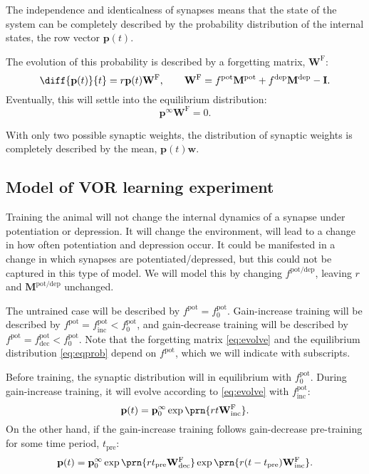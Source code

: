 \documentclass[12pt]{article}
\newcommand{\I}{\mathbf{I}}
\newcommand{\pr}{\mathbf{p}}
\newcommand{\eq}{\pr^\infty}
\newcommand{\w}{\mathbf{w}}
\newcommand{\W}{\mathbf{W}}
\newcommand{\frg}{\W^\mathrm{F}}
\newcommand{\M}{\mathbf{M}}
\newcommand{\pot}{^{\text{pot}}}
\newcommand{\dep}{^{\text{dep}}}
\newcommand{\potdep}{^{\text{pot/dep}}}
\newcommand{\norm}{_0}
\newcommand{\inc}{_{\text{inc}}}
\newcommand{\dec}{_{\text{dec}}}
\newcommand{\tpre}{t_{\text{pre}}}
\begin{document}
The independence and identicalness of synapses means that the state of the system can be completely described by the probability distribution of the internal states, the row vector $\pr(t)$.

The evolution of this probability is described by a forgetting matrix, $\frg$:
%
\begin{equation}\label{eq:evolve}
  \diff{\pr(t)}{t} = r\pr(t)\frg,
  \qquad
  \frg = f\pot\M\pot+f\dep\M\dep-\I.
\end{equation}
%
Eventually, this will settle into the equilibrium distribution:
%
\begin{equation}\label{eq:eqprob}
  \eq\frg=0.
\end{equation}
%



With only two possible synaptic weights, the distribution of synaptic weights is completely described by the mean, $\pr(t)\w$.


\subsection{Model of VOR learning experiment}\label{sec:learning}

Training the animal will not change the internal dynamics of a synapse under potentiation or depression.
It will change the environment, will lead to a change in how often potentiation and depression occur.
It could be manifested in a change in which synapses are potentiated/depressed, but this could not be captured in this type of model.
We will model this by changing $f\potdep$, leaving $r$ and $\M\potdep$ unchanged.

The untrained case will be described by $f\pot=f\pot\norm$.
Gain-increase training  will be described by $f\pot=f\pot\inc<f\pot\norm$, and
gain-decrease training  will be described by $f\pot=f\pot\dec<f\pot\norm$. Note that the forgetting matrix \eqref{eq:evolve} and the equilibrium distribution \eqref{eq:eqprob} depend on $f\pot$, which we will indicate with subscripts.

Before training, the synaptic distribution will in equilibrium with $f\pot\norm$.
During gain-increase training, it will evolve according to \eqref{eq:evolve} with $f\pot\inc$:
%
\begin{equation}\label{eq:nopre}
  \pr(t) = \eq\norm \exp\prn{rt\frg\inc}.
\end{equation}
%
On the other hand, if the gain-increase training follows gain-decrease pre-training for some time period, $\tpre$:
%
\begin{equation}\label{eq:withpre}
  \pr(t) = \eq\norm \exp\prn{r\tpre\frg\dec} \exp\prn{r(t-\tpre)\frg\inc}.
\end{equation}
%
\end{document}
